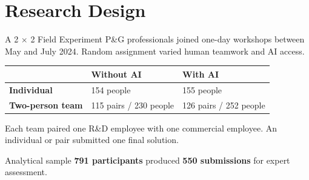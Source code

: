 \section{Research Design}
\begin{frame}[t]{A 2 $\times$ 2 Field Experiment}
\small
P\&G professionals joined one-day workshops between May and July 2024. Random assignment varied human teamwork and AI access.

\vspace{0.42cm}
\renewcommand{\arraystretch}{1.65}
\begin{tabularx}{\linewidth}{@{}>{\bfseries}lXX@{}}\toprule
&\textbf{Without AI}&\textbf{With AI}\\\midrule
Individual&154 people&155 people\\
Two-person team&115 pairs / 230 people&126 pairs / 252 people\\\bottomrule
\end{tabularx}

\vspace{0.45cm}
Each team paired one R\&D employee with one commercial employee. An individual or pair submitted one final solution.

\vspace{0.33cm}
\begin{alertblock}{Analytical sample}
\textbf{791 participants} produced \textbf{550 submissions} for expert assessment.
\end{alertblock}
\end{frame}

